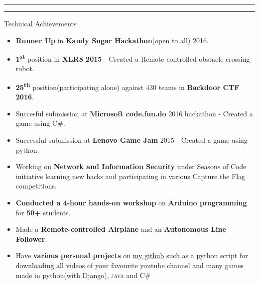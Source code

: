 \documentclass{resume_ssl}
\begin{document}
\rule{\textwidth}{1pt}


\rule{\textwidth}{1pt}

\begin{Section}{Technical Achievements}
\normalsize
{
\begin{itemize}
\item{\textbf{Runner Up} in \textbf{Kandy Sugar Hackathon}(open to all) 2016.}
\item{\textbf{1\textsuperscript{st}} position in \textbf{XLR8 2015} - Created a Remote controlled obstacle crossing robot.}
\item{\textbf{25\textsuperscript{th}} position(participating alone) against 430 teams in \textbf{Backdoor CTF 2016}.}
\item{Succesful submission at \textbf{Microsoft code.fun.do} 2016 hackathon - Created a game using C\#.}
\item{Successful submission at \textbf{Lenovo Game Jam} 2015 - Created a game using python.}
\item{Working on \textbf{Network and Information Security} under Seasons of Code initiative  learning new hacks and participating in various Capture the Flag competitions.}
\item{\textbf{Conducted a 4-hour hands-on workshop} on \textbf{Arduino programming} for \textbf{50+} students.}
\item{Made a \textbf{Remote-controlled Airplane} and an \textbf{Autonomous Line Follower}.}
\item{Have \textbf{various personal projects} on \href{https://github.com/CodeMaxx}{my github} such as a python script for downloading all videos of your favourite youtube channel and many games made in python(with Django), \textsc{java} and C\#}
\end{itemize}
}
\end{Section}


\end{document}
